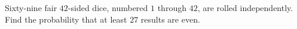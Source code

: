 Sixty-nine fair $42$-sided dice, numbered $1$ through $42$, are rolled independently. Find the probability that at least $27$ results are even.
